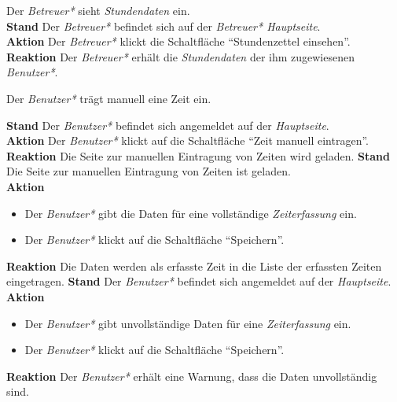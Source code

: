 \begin{requirements}
     Der \emph{Betreuer*} sieht \emph{Stundendaten} ein. \\
        \textbf{Stand} Der \emph{Betreuer*} befindet sich auf der \emph{Betreuer* Hauptseite}. \\
        \textbf{Aktion} Der \emph{Betreuer*} klickt die Schaltfläche "`Stundenzettel einsehen"'. \\
        \textbf{Reaktion} Der \emph{Betreuer*} erhält die \emph{Stundendaten} der ihm zugewiesenen \emph{Benutzer*}.
        
     Der \emph{Benutzer*} trägt manuell eine Zeit ein.
    \begin{requirements}
            \textbf{Stand} Der \emph{Benutzer*} befindet sich angemeldet auf der \emph{Hauptseite}. \\
            \textbf{Aktion} Der \emph{Benutzer*} klickt auf die Schaltfläche "`Zeit manuell eintragen"'. \\
            \textbf{Reaktion} Die Seite zur manuellen Eintragung von Zeiten wird geladen.
            \textbf{Stand} Die Seite zur manuellen Eintragung von Zeiten ist geladen. \\
            \textbf{Aktion} 
                \begin{itemize}
                    \item Der \emph{Benutzer*} gibt die Daten für eine vollständige \emph{Zeiterfassung} ein.
                    \item Der \emph{Benutzer*} klickt auf die Schaltfläche "`Speichern"'.
               \end{itemize}
            \textbf{Reaktion} Die Daten werden als erfasste Zeit in die Liste der erfassten Zeiten eingetragen.
            \textbf{Stand} Der \emph{Benutzer*} befindet sich angemeldet auf der \emph{Hauptseite}. \\
            \textbf{Aktion}
                \begin{itemize}
                    \item Der \emph{Benutzer*} gibt unvollständige Daten für eine \emph{Zeiterfassung} ein.
                    \item Der \emph{Benutzer*} klickt auf die Schaltfläche "`Speichern"'.
                \end{itemize}
            \textbf{Reaktion} Der \emph{Benutzer*} erhält eine Warnung, dass die Daten unvollständig sind.
    \end{requirements}


\end{requirements}
